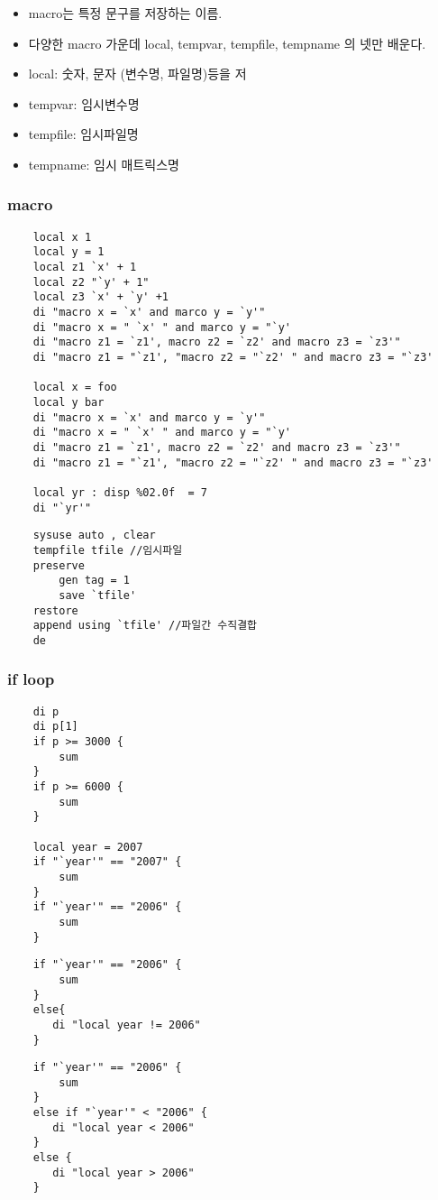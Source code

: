 \documentclass[aspectratio=169,xcolor=dvipsnames,handout]{beamer}
\begin{document}
\begin{frame}
    \begin{itemize}[<+->]
        \item macro는 특정 문구를 저장하는 이름.
        \item 다양한 macro 가운데 local, tempvar, tempfile, tempname 의 넷만 배운다.
        \item local: 숫자, 문자 (변수명, 파일명)등을 저
        \item tempvar: 임시변수명
        \item tempfile: 임시파일명
        \item tempname: 임시 매트릭스명
    \end{itemize}
    \frametitle{macro}
    \begin{verbatim}
    local x 1
    local y = 1
    local z1 `x' + 1
    local z2 "`y' + 1"
    local z3 `x' + `y' +1
    di "macro x = `x' and marco y = `y'" 
    di "macro x = " `x' " and marco y = "`y' 
    di "macro z1 = `z1', macro z2 = `z2' and macro z3 = `z3'" 
    di "macro z1 = "`z1', "macro z2 = "`z2' " and macro z3 = "`z3' 

    local x = foo
    local y bar
    di "macro x = `x' and marco y = `y'" 
    di "macro x = " `x' " and marco y = "`y' 
    di "macro z1 = `z1', macro z2 = `z2' and macro z3 = `z3'" 
    di "macro z1 = "`z1', "macro z2 = "`z2' " and macro z3 = "`z3' 

    local yr : disp %02.0f  = 7
    di "`yr'"
    \end{verbatim}
    \framebreak%
    \begin{verbatim}
    sysuse auto , clear
    tempfile tfile //임시파일
    preserve
        gen tag = 1
        save `tfile'
    restore
    append using `tfile' //파일간 수직결합
    de
    \end{verbatim}
\end{frame}


\begin{frame}
    \frametitle{if loop}
    \begin{verbatim}
    di p
    di p[1]
    if p >= 3000 {
        sum
    }
    if p >= 6000 {
        sum
    }

    local year = 2007
    if "`year'" == "2007" {
        sum 
    }
    if "`year'" == "2006" {
        sum 
    }
    \end{verbatim}
\framebreak%
    \begin{verbatim}
    if "`year'" == "2006" {
        sum 
    }
    else{
       di "local year != 2006"
    }
    \end{verbatim}
\framebreak%
    \begin{verbatim}
    if "`year'" == "2006" {
        sum 
    }
    else if "`year'" < "2006" {
       di "local year < 2006"
    }
    else {
       di "local year > 2006"
    }
    \end{verbatim}
\end{frame}
\end{document}
